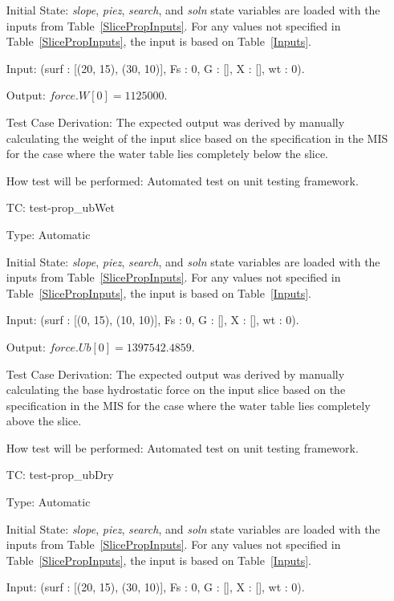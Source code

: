 \documentclass[12pt, titlepage]{article}
\newcounter{utestnum} %
\begin{document}
\begin{enumerate}[label=TC\arabic*:,ref={\arabic*}]
	Initial State: \textit{slope}, \textit{piez}, \textit{search}, and 
	\textit{soln} state variables are loaded with the inputs from 
	Table~\ref{SlicePropInputs}. For any values not specified in 
	Table~\ref{SlicePropInputs}, the input is based on Table~\ref{Inputs}.
	
	Input: (surf : [(20, 15), (30, 10)], Fs : 0, G : [], X : [], wt : 
	0).
	
	Output: $\textit{force.W}[0] = 1125000$.
	
	Test Case Derivation: The expected output was derived by manually 
	calculating the weight of the input slice based on the specification in the 
	MIS for the case where the water table lies completely below the slice.
	
	How test will be performed: Automated test on unit testing framework.
	
	\item [TC\refstepcounter{utestnum}\theutestnum: 
	\label{TC_PropertyUbWet}] 
	test-prop\_ubWet
	
	Type: Automatic
	
	Initial State: \textit{slope}, \textit{piez}, \textit{search}, and 
	\textit{soln} state variables are loaded with the inputs from 
	Table~\ref{SlicePropInputs}. For any values not specified in 
	Table~\ref{SlicePropInputs}, the input is based on Table~\ref{Inputs}.
	
	Input: (surf : [(0, 15), (10, 10)], Fs : 0, G : [], X : [], wt : 
	0).
	
	Output: $\textit{force.Ub}[0] = 1397542.4859$.
	
	Test Case Derivation: The expected output was derived by manually 
	calculating the base hydrostatic force on the input slice based on the 
	specification in the MIS for the case where the water table lies completely 
	above the slice.
	
	How test will be performed: Automated test on unit testing framework.
	
	\item [TC\refstepcounter{utestnum}\theutestnum: 
	\label{TC_PropertyUbDry}] 
	test-prop\_ubDry
	
	Type: Automatic
	
	Initial State: \textit{slope}, \textit{piez}, \textit{search}, and 
	\textit{soln} state variables are loaded with the inputs from 
	Table~\ref{SlicePropInputs}. For any values not specified in 
	Table~\ref{SlicePropInputs}, the input is based on Table~\ref{Inputs}.
	
	Input: (surf : [(20, 15), (30, 10)], Fs : 0, G : [], X : [], wt : 
	0).
	

\end{enumerate}
\end{document}
